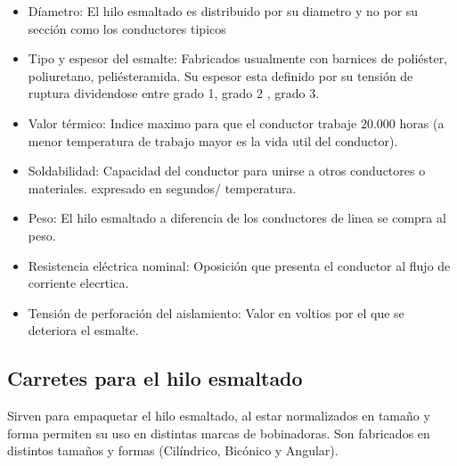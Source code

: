 \documentclass{report}
\begin{document}
      \begin{itemize}
        
        \item{Díametro:} El hilo esmaltado es distribuido por su diametro y no por su sección como los conductores tipicos

        \item{Tipo y espesor del esmalte:} Fabricados usualmente con barnices de poliéster, poliuretano, peliésteramida. Su espesor esta 
          definido por su tensión de ruptura dividendose entre grado 1, grado 2 , grado 3.

        \item{Valor térmico:} Indice maximo para que el conductor trabaje 20.000 horas (a menor temperatura de trabajo 
          mayor es la vida util del conductor).

        \item{Soldabilidad:} Capacidad del conductor para unirse a otros conductores o materiales. expresado en segundos/ temperatura.

        \item{Peso:} El hilo esmaltado a diferencia de los conductores de linea se compra al peso.

        \item{Resistencia eléctrica nominal:} Oposición que presenta el conductor al flujo de corriente elecrtica.

        \item{Tensión de perforación del aislamiento:} Valor en voltios por el que se deteriora el esmalte.

      \end{itemize}
    \vspace{2em}
    \subsection{Carretes para el hilo esmaltado}\label{ssec:carretes_hilo}
      Sirven para empaquetar el hilo esmaltado, al estar normalizados en tamaño y forma permiten su uso en distintas marcas de bobinadoras.
      Son fabricados en distintos tamaños y formas (Cilíndrico, Bicónico y Angular).
    \newpage
\end{document}
